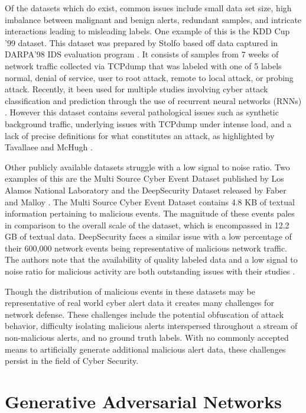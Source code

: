 Of the datasets which do exist, common issues include small data set size, high imbalance between malignant and benign alerts, redundant samples, and intricate interactions leading to misleading labels. One example of this is the KDD Cup '99 \cite{kdd-cup} dataset. This dataset was prepared by Stolfo \etal \cite{Stolfo} based off data captured in DARPA'98 IDS evaluation program \cite{Lippmann}. It consists of samples from 7 weeks of network traffic collected via TCPdump that was labeled with one of 5 labels {normal, denial of service, user to root attack, remote to local attack, or probing attack}. Recently, it been used for multiple studies involving cyber attack classification and prediction through the use of recurrent neural networks (RNNs) \cite{Kim, Staudemeyer}. However this dataset contains several pathological issues such as synthetic background traffic, underlying issues with TCPdump under intense load, and a lack of precise definitions for what constitutes an attack, as highlighted by Tavallaee \etal \cite{Tavallaee} and McHugh \cite{McHugh}.

Other publicly available datasets struggle with a low signal to noise ratio. Two examples of this are the Multi Source Cyber Event Dataset published by Los Alamos National Laboratory \cite{akent-2015-enterprise-data} and the DeepSecurity Dataset released by Faber and Malloy \cite{Faber2018}. The Multi Source Cyber Event Dataset contains 4.8 KB of textual information pertaining to malicious events. The magnitude of these events pales in comparison to the overall scale of the dataset, which is encompassed in 12.2 GB of textual data. DeepSecurity faces a similar issue with a low percentage of their 600,000 network events being representative of malicious network traffic. The authors note that the availability of quality labeled data and a low signal to noise ratio for malicious activity are both outstanding issues with their studies \cite{Faber2018}. 

Though the distribution of malicious events in these datasets may be representative of real world cyber alert data it creates many challenges for network defense. These challenges include the potential obfuscation of attack behavior, difficulty isolating malicious alerts interspersed throughout a stream of non-malicious alerts, and no ground truth labels. With no commonly accepted means to artificially generate additional malicious alert data, these challenges persist in the field of Cyber Security. 

\section{Generative Adversarial Networks}

